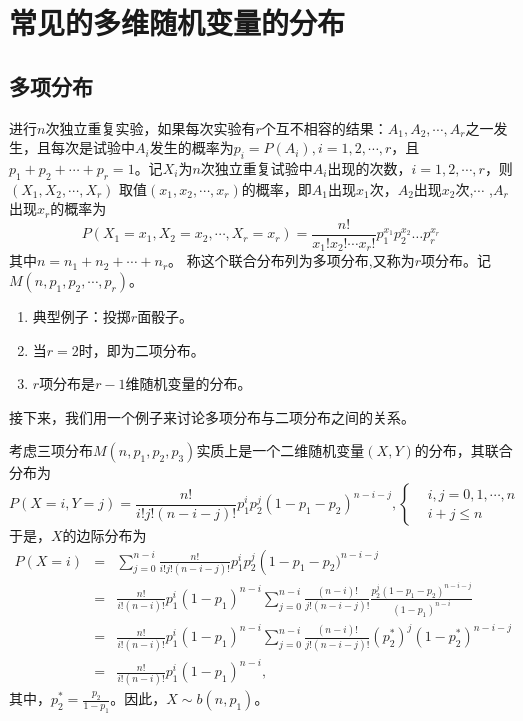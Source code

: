  \section{常见的多维随机变量的分布}
 \subsection{多项分布}
 \begin{definition}
     进行$n$次独立重复实验，如果每次实验有$r$个互不相容的结果：$A_1,A_2,\cdots,A_r$之一发生，且每次是试验中$A_i$发生的概率为$p_i = P(A_i),i=1,2,\cdots,r$，且$p_{1}+p_{2}+ \cdots +p_{r}=1$。记$X_{i}$为$n$次独立重复试验中$A_{i}$出现的次数，$i=1,2, \cdots ,r$，则$(X_{1}, X_{2}, \cdots, X_{r})$ 取值$(x_{1}, x_{2}, \cdots, x_{r})$的概率，即$A_{1}$出现$x_{1}$次，$A_{2}$出现$x_{2}$次,$\cdots$ ,$A_{r}$出现$x_{r}$的概率为$$P\left(X_{1}=x_{1}, X_{2}=x_{2}, \cdots, X_{r}=x_{r}\right)=\frac{n!}{x_{1} ! x_{2} !\cdots x_{r} !} p_{1}^{x_{1}} p_{2}^{x_{2}} \ldots p_{r}^{x_{r}}$$
 其中$n=n_{1}+n_{2}+ \cdots +n_{r}$。
 称这个联合分布列为多项分布,又称为$r$项分布。记$M(n,p_{1}, p_{2}, \cdots, p_{r})$。
 \end{definition}
\begin{remark}
    \begin{enumerate}
        \item 典型例子：投掷$r$面骰子。
        \item 当$r=2$时，即为二项分布。
        \item $r$项分布是$r-1$维随机变量的分布。
    \end{enumerate}
\end{remark}
 接下来，我们用一个例子来讨论多项分布与二项分布之间的关系。 
 \begin{example}
 考虑三项分布$M(n,p_{1}, p_{2}, p_{3})$实质上是一个二维随机变量$(X,Y)$的分布，其联合分布为
 $$
 P(X=i, Y=j)=\frac{n !}{i ! j !(n-i-j) !} p_{1}^{i} p_{2}^{j}\left(1-p_{1}-p_{2}\right)^{n-i-j},
 \left\{\begin{aligned}
 &i, j=0,1, \cdots, n \\
&i+j \leq n
 \end{aligned}
 \right.
$$
于是，$X$的边际分布为
\begin{eqnarray*}
P(X=i) &=&\sum_{j=0}^{n-i} \frac{n !}{i ! j !(n-i-j) !} p_{1}^{i} p_{2}^{j}\left(1-p_{1}-p_{2})^{n-i-j}\right.\\
&=&\frac{n !}{i !(n-i) !} p_{1}^{i}\left(1-p_{1}\right)^{n-i} 
\sum_{j=0}^{n-i} \frac{(n-i) !}{j !(n-i-j) !} \frac{p_{2}^{j}\left(1-p_{1}-p_{2}\right)^{n-i-j}}{\left(1-p_{1}\right)^{n-i}} \\
&=&\frac{n !}{i !(n-i) !} p_{1}^{i}\left(1-p_{1}\right)^{n-i} \sum_{j=0}^{n-i} \frac{(n-i) !}{j !(n-i-j) !} (p_{2}^{\ast})^{ j}\left(1-p_{2}^{\ast}\right)^{n-i-j} \\
&=&\frac{n !}{i !(n-i) !} p_{1}^{i}\left(1-p_{1}\right)^{n-i},
\end{eqnarray*}  
其中，$p_{2}^{\ast}=\frac{p_{2}}{1-p_{1}}$。因此，$X \sim  b\left(n, p_{1}\right)$。
 \end{example}
